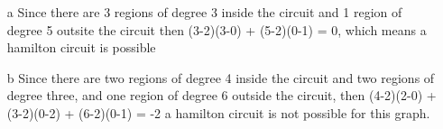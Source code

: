 \documentclass{article}
\begin{document}
\begin{enumerate}

\item[a]
Since there are 3 regions of degree 3 inside the circuit and 1 region of degree 5 outsite the circuit then (3-2)(3-0) + (5-2)(0-1) = 0, which means a hamilton circuit is possible 
\vspace{20 mm}

\item[b]
Since there are two regions of degree 4 inside the circuit and two regions of degree three, and one region of degree 6 outside the circuit, then (4-2)(2-0) + (3-2)(0-2) + (6-2)(0-1) = -2 a hamilton circuit is not possible for this graph. 

\end{enumerate}
\end{document}
